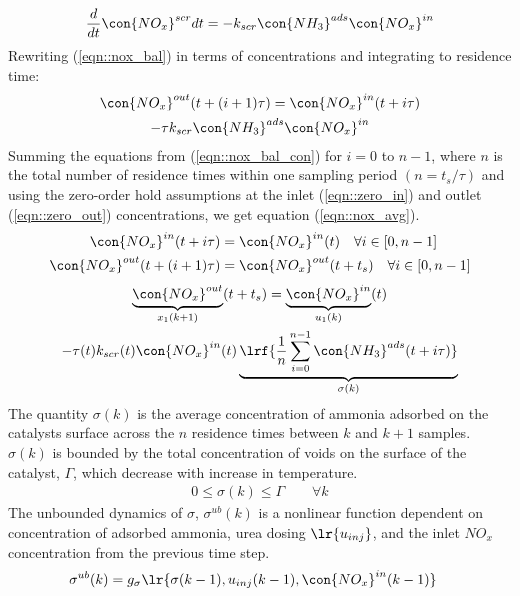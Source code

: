 \begin{align}
    \frac{d}{dt} \con{NO_x}^{scr}dt = -k_{scr} \con{NH_3}^{ads} \con{NO_x}^{in}
\end{align}
Rewriting (\ref{eqn::nox_bal}) in terms of concentrations and integrating to residence time:
\begin{multline}
        \con{NO_x}^{out} (t + (i+1) \tau) =
                \con{NO_x}^{in} (t + i \tau) \\
                -\tau k_{scr} \con{NH_3}^{ads} \con{NO_x}^{in}
        \label{eqn::nox_bal_con}
\end{multline}
Summing the equations from (\ref{eqn::nox_bal_con}) for  $i = 0$ to $n-1$, where $n$ is the total number of residence times within one sampling period $(n= t_s/\tau)$ and using the zero-order hold assumptions at the inlet (\ref{eqn::zero_in}) and outlet (\ref{eqn::zero_out}) concentrations, we get equation (\ref{eqn::nox_avg}).
\begin{align}
    \con{NO_x}^{in} (t + i \tau) &= \con{NO_x}^{in}(t) \quad \forall i \in [0, n-1]  \label{eqn::zero_in}\\
    \con{NO_x}^{out} (t + (i+1) \tau) &= \con{NO_x}^{out}(t + t_s) \quad \forall i \in [0, n-1] \label{eqn::zero_out}
\end{align}
\begin{multline}
        \underbrace{\con{NO_x}^{out}}_{x_1(k+1)}(t+t_s) =
                \underbrace{\con{NO_x}^{in}}_{u_1(k)}(t) \\
                - \tau(t) k_{scr}(t) \con{NO_x}^{in}(t) \underbrace{\lrf{\frac{1}{n} \sum_{i = 0}^{n-1} \con{NH_3}^{ads}(t + i \tau)}}_{\sigma(k)}
        \label{eqn::nox_avg}
\end{multline}
%
%
The quantity $\sigma(k)$ is the average concentration of ammonia adsorbed on the catalysts surface across the $n$ residence times between $k$ and $k+1$ samples. $\sigma(k)$ is bounded by the total concentration of voids on the surface of the catalyst, $\Gamma$, which decrease with increase in temperature.
\begin{align}
    0 \leq \sigma(k) \leq \Gamma \qquad \forall k
\end{align}
The unbounded dynamics of $\sigma$, $\sigma^{ub}(k)$ is a nonlinear function dependent on concentration of adsorbed ammonia, urea dosing $\lr{u_{inj}}$, and the inlet $NO_x$ concentration from the previous time step.
\begin{align}
    \sigma^{ub}(k) &= g_{\sigma} \lr{ \sigma(k-1), u_{inj}(k-1), \con{NO_x}^{in}(k-1) }
\end{align}
